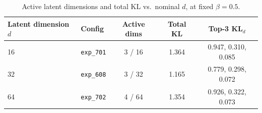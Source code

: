
\begin{table}[H]
\centering
\small
\begin{tabular*}{\textwidth}{@{\extracolsep{\fill}}llccc}
\toprule
Latent dimension $d$ & Config & Active dims & Total KL & Top-3 KL$_d$ \\
\midrule
16 & \texttt{exp\_701} & 3 / 16 & 1.364 & 0.947, 0.310, 0.085 \\
32 & \texttt{exp\_608} & 3 / 32 & 1.165 & 0.779, 0.298, 0.072 \\
64 & \texttt{exp\_702} & 4 / 64 & 1.354 & 0.926, 0.322, 0.073 \\
\bottomrule
\end{tabular*}
\caption{\small Active latent dimensions and total KL vs.\ nominal $d$, at fixed $\beta=0.5$.}
\label{tab:beta_dim_crosscheck}
\end{table}

\newpage






